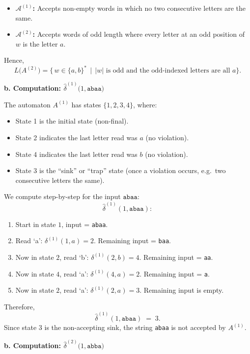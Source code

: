 \documentclass{article}
\theoremstyle{theorem}
\theoremstyle{definition}
\theoremstyle{remark}
\begin{document}
\begin{itemize}
    \item \textbf{$\mathcal{A}^{(1)}$:} Accepts non-empty words in which no two consecutive letters are the same.
    \item \textbf{$\mathcal{A}^{(2)}$:} Accepts words of odd length where every letter at an odd position of $w$ is the letter $a$.
\end{itemize}
Hence,
\[
L\bigl(A^{(2)}\bigr)
=\bigl\{\,w \in \{a,b\}^* \,\mid\, |w|\text{ is odd and the odd-indexed letters are all }a\bigr\}.
\]

\bigskip

\textbf{b. Computation: $\widehat{\delta}^{(1)}\bigl(1,\texttt{abaa}\bigr)$}

The automaton $A^{(1)}$ has states $\{1,2,3,4\}$, where:
\begin{itemize}
    \item State 1 is the initial state (non-final).
    \item State 2 indicates the last letter read was $a$ (no violation).
    \item State 4 indicates the last letter read was $b$ (no violation).
    \item State 3 is the ``sink'' or ``trap'' state (once a violation occurs, e.g.\ two consecutive letters the same).
\end{itemize}
We compute step-by-step for the input \(\texttt{abaa}\):
\[
\widehat{\delta}^{(1)}(1,\texttt{abaa}):
\]
\begin{enumerate}
    \item Start in state $1$, input = \texttt{abaa}.
    \item Read `a': $\delta^{(1)}(1,a) = 2$. Remaining input = \texttt{baa}.
    \item Now in state $2$, read `b': $\delta^{(1)}(2,b) = 4$. Remaining input = \texttt{aa}.
    \item Now in state $4$, read `a': $\delta^{(1)}(4,a) = 2$. Remaining input = \texttt{a}.
    \item Now in state $2$, read `a': $\delta^{(1)}(2,a) = 3$. Remaining input is empty.
\end{enumerate}
Therefore,
\[
\widehat{\delta}^{(1)}(1,\texttt{abaa}) \;=\; 3.
\]
Since state $3$ is the non-accepting sink, the string \texttt{abaa} is not accepted by $A^{(1)}$.

\bigskip

\textbf{b. Computation: $\widehat{\delta}^{(2)}\bigl(1,\texttt{abba}\bigr)$}
\end{document}
